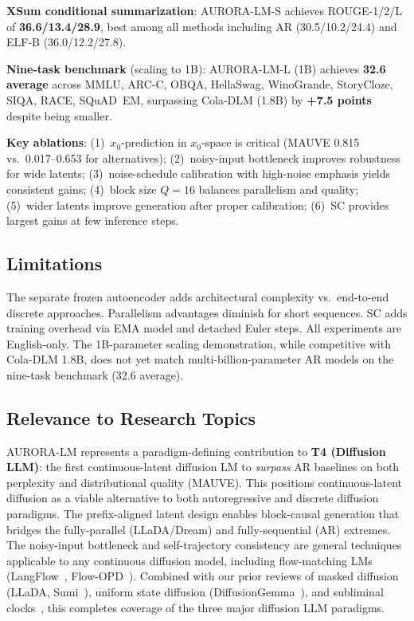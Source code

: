 \documentclass[11pt,a4paper]{article}
\begin{document}
\textbf{XSum conditional summarization}: AURORA-LM-S achieves ROUGE-1/2/L of \textbf{36.6/13.4/28.9}, best among all methods including AR (30.5/10.2/24.4) and ELF-B (36.0/12.2/27.8).

\textbf{Nine-task benchmark} (scaling to 1B): AURORA-LM-L (1B) achieves \textbf{32.6 average} across MMLU, ARC-C, OBQA, HellaSwag, WinoGrande, StoryCloze, SIQA, RACE, SQuAD~EM, surpassing Cola-DLM (1.8B) by \textbf{+7.5 points} despite being smaller.

\textbf{Key ablations}: (1)~$x_0$-prediction in $x_0$-space is critical (MAUVE 0.815 vs.\ 0.017--0.653 for alternatives); (2)~noisy-input bottleneck improves robustness for wide latents; (3)~noise-schedule calibration with high-noise emphasis yields consistent gains; (4)~block size $Q = 16$ balances parallelism and quality; (5)~wider latents improve generation after proper calibration; (6)~SC provides largest gains at few inference steps.

\subsection{Limitations}
The separate frozen autoencoder adds architectural complexity vs.\ end-to-end discrete approaches. Parallelism advantages diminish for short sequences. SC adds training overhead via EMA model and detached Euler steps. All experiments are English-only. The 1B-parameter scaling demonstration, while competitive with Cola-DLM 1.8B, does not yet match multi-billion-parameter AR models on the nine-task benchmark (32.6 average).

\subsection{Relevance to Research Topics}
AURORA-LM represents a paradigm-defining contribution to \textbf{T4 (Diffusion LLM)}: the first continuous-latent diffusion LM to \emph{surpass} AR baselines on both perplexity and distributional quality (MAUVE). This positions continuous-latent diffusion as a viable alternative to both autoregressive and discrete diffusion paradigms. The prefix-aligned latent design enables block-causal generation that bridges the fully-parallel (LLaDA/Dream) and fully-sequential (AR) extremes. The noisy-input bottleneck and self-trajectory consistency are general techniques applicable to any continuous diffusion model, including flow-matching LMs (LangFlow~\cite{langflow2026}, Flow-OPD~\cite{flowopd2026}). Combined with our prior reviews of masked diffusion (LLaDA, Sumi~\cite{sumi2026}), uniform state diffusion (DiffusionGemma~\cite{diffusiongemma2026}), and subliminal clocks~\cite{subliminalclocks2026}, this completes coverage of the three major diffusion LLM paradigms.
\end{document}
